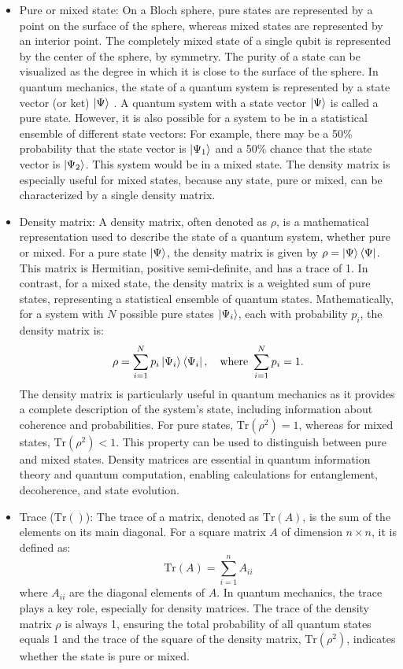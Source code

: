 \documentclass{article}
\begin{document}
\begin{itemize}
			\item Pure or mixed state:  On a Bloch sphere, pure states are represented by a point on the surface of the sphere, whereas mixed states are represented by an interior point. The completely mixed state of a single qubit is represented by the center of the sphere, by symmetry. The purity of a state can be visualized as the degree in which it is close to the surface of the sphere. In quantum mechanics, the state of a quantum system is represented by a state vector (or ket) $\ket{\Psi}$ . A quantum system with a state vector $\ket{\Psi}$ is called a pure state. However, it is also possible for a system to be in a statistical ensemble of different state vectors: For example, there may be a 50\% probability that the state vector is $\ket{\Psi_{1}}$ and a 50\% chance that the state vector is $\ket{\Psi_{2}}$. This system would be in a mixed state. The density matrix is especially useful for mixed states, because any state, pure or mixed, can be characterized by a single density matrix. 
			
			\item Density matrix: A density matrix, often denoted as \( \rho \), is a mathematical representation used to describe the state of a quantum system, whether pure or mixed. For a pure state \( \ket{\Psi} \), the density matrix is given by \( \rho = \ket{\Psi}\bra{\Psi} \). This matrix is Hermitian, positive semi-definite, and has a trace of 1. In contrast, for a mixed state, the density matrix is a weighted sum of pure states, representing a statistical ensemble of quantum states. Mathematically, for a system with \( N \) possible pure states \( \ket{\Psi_i} \), each with probability \( p_i \), the density matrix is:
			\[
			\rho = \sum_{i=1}^N p_i \ket{\Psi_i}\bra{\Psi_i}, \quad \text{where } \sum_{i=1}^N p_i = 1.
			\]
			The density matrix is particularly useful in quantum mechanics as it provides a complete description of the system's state, including information about coherence and probabilities. For pure states, \( \text{Tr}(\rho^2) = 1 \), whereas for mixed states, \( \text{Tr}(\rho^2) < 1 \). This property can be used to distinguish between pure and mixed states. Density matrices are essential in quantum information theory and quantum computation, enabling calculations for entanglement, decoherence, and state evolution.

			\item Trace (\(\text{Tr}()\)): The trace of a matrix, denoted as \(\text{Tr}(A)\), is the sum of the elements on its main diagonal. For a square matrix \(A\) of dimension \(n \times n\), it is defined as:
			\[
			\text{Tr}(A) = \sum_{i=1}^n A_{ii}
			\]
			where \(A_{ii}\) are the diagonal elements of \(A\). In quantum mechanics, the trace plays a key role, especially for density matrices. The trace of the density matrix \(\rho\) is always 1, ensuring the total probability of all quantum states equals 1 and the trace of the square of the density matrix, \(\text{Tr}(\rho^2)\), indicates whether the state is pure or mixed.


\end{itemize}
\end{document}
